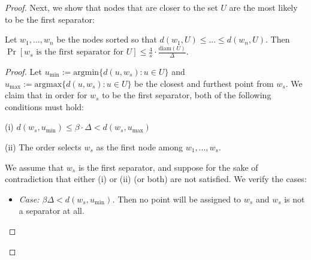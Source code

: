 \begin{proof}
Next, we show that nodes that are closer to the set $U$ are the most likely to be the first separator: 
\begin{lemma} \label{lem:CKR-ProbWsIsFirstSeparator}
  Let $w_1,\ldots,w_n$ be the nodes sorted so that $d(w_1,U) \leq \ldots \leq d(w_n,U)$.
  Then \\$\Pr[w_s\textrm{ is the first separator for }U] \leq \frac{4}{s} \cdot \frac{\textrm{diam}(U)}{\Delta}$.
\end{lemma}
\begin{proof}
  Let $u_{\min} := \textrm{argmin}\{ d(u,w_s) : u \in U\}$ and $u_{\max} := \textrm{argmax}\{ d(u,w_s) : u \in U\}$
  be the closest and furthest point from $w_s$.
  We claim that in order for $w_s$ to be the first separator, both of the following
  conditions must hold:
\begin{enumerate*}
\item[(i)] $d(w_s,u_{\min}) \leq \beta \cdot \Delta < d(w_s,u_{\max})$
\item[(ii)] The order selects $w_s$ as the first node among $w_1,\ldots,w_s$.
\end{enumerate*}
We assume that $w_s$ is the first separator, and
suppose for the sake of contradiction that either (i) or (ii) (or both) are not satisfied.
We verify the cases:
\begin{itemize}
\item \emph{Case: $\beta \Delta < d(w_s,u_{\min})$.} Then no point will be assigned to $w_s$ and $w_s$ is not a separator at all.

\end{itemize}
\end{proof}
\end{proof}
